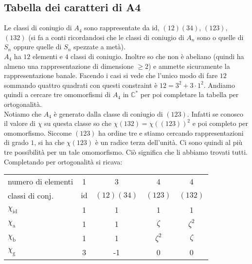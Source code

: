 \documentclass[a4paper,NoNotes,GeneralMath]{stdmdoc}
\begin{document}
	\subsection{Tabella dei caratteri di A4}
	Le classi di coniugio di $A_4$ sono rappresentate da $\text{id}$, $(1 2)(3 4)$, $(1 2 3)$, $(1 3 2)$ (si fa a conti ricordandosi che le classi di coniugio di $A_n$ sono o quelle di $S_n$ oppure quelle di $S_n$ spezzate a metà). \\
	$A_4$ ha $12$ elementi e $4$ classi di coniugio. Inoltre so che non è abeliano (quindi ha almeno una rappresentazione di dimensione $\ge 2$) e ammette sicuramente la rappresentazione banale. Facendo i casi si vede che l'unico modo di fare $12$ sommando quattro quadrati con questi constraint è $12 = 3^2 + 3 \cdot 1^2$. Andiamo quindi a cercare tre omomorfismi di $A_4$ in $\mathbb{C}^{*}$ per poi completare la tabella per ortogonalità. \\
	Notiamo che $A_4$ è generato dalla classe di coniugio di $(1 2 3)$. Infatti se conosco il valore di $\chi$ su questa classe so che $\chi (1 3 2) = \chi((1 2 3)) ^2$ e poi completo per omomorfismo. Siccome $(1 2 3)$ ha ordine tre e stiamo cercando rappresentazioni di grado $1$, si ha che $\chi (1 2 3)$ è un radice terza dell'unità. Ci sono quindi al più tre possibilità per un tale omomorfismo. Ciò significa che li abbiamo trovati tutti. \\
	Completando per ortogonalità si ricava:
	\begin{center} \begin{tabular}{lcccc}
	numero di elementi & 1   & 3   & 4   & 4   \\
	classi di conj. & $\text{id}$ & $(1 2)(3 4)$ & $(1 2 3)$ & $(1 3 2)$ \\ \hline
	$\chi_\text{id}$ & 1    & 1    & 1    & 1    \\
	$\chi_\text{a}$  & 1    & 1    & $\zeta$ & $\zeta^2$ \\
	$\chi_\text{b}$  & 1    & 1    & $\zeta^2$ & $\zeta$ \\
	$\chi_\text{g}$  & 3    & -1   & 0    & 0    \\
	\end{tabular} \end{center} \vskip 0.5cm
\end{document}
